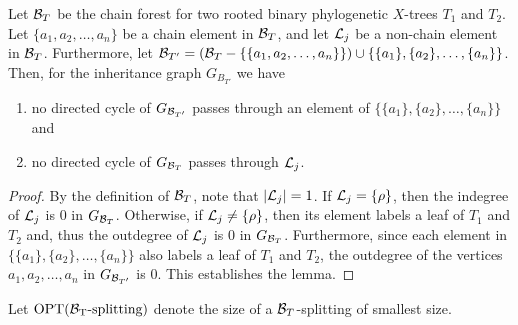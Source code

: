 \begin{lemma}\label{l:bTprops}
Let ${\mathcal B}_T$ be the chain forest for two rooted binary phylogenetic $X$-trees $T_1$ and $T_2$. Let $\{a_1,a_2,\ldots,a_n\}$ be a chain  element in ${\mathcal B}_T$, and let {${\mathcal L}_j$ be a non-chain element in ${\mathcal B}_T$}. Furthermore, let ${\mathcal B}_{T'}=({\mathcal B}_T-\{\{a_1,a_2,\ldots,a_n\}\})\cup\{\{a_1\},\{a_2\},\ldots,\{a_n\}\}$. Then, for the inheritance graph $G_{B_{T'}}$ we have
\begin{enumerate}
\item no directed cycle of $G_{{\mathcal B}_{T'}}$ passes through an element of $\{\{a_1\},\{a_2\},\ldots,\{a_n\}\}$ and
\item no directed cycle of $G_{{\mathcal B}_T}$ passes through {${\mathcal L}_j$}.
\end{enumerate}
\end{lemma}
\begin{proof}
{By the definition of ${\mathcal B}_T$, note that $|{\mathcal L}_j|=1$. If ${\mathcal L}_j=\{\rho\}$, then the indegree of ${\mathcal L}_j$ is 0 in $G_{{\mathcal B}_T}$. Otherwise, if ${\mathcal L}_j\ne\{\rho\}$, then its element labels a leaf of $T_1$ and $T_2$  and, thus the outdegree of ${\mathcal L}_j$ is 0 in $G_{{\mathcal B}_T}$.} Furthermore, since each element in $\{\{a_1\},\{a_2\},\ldots,\{a_n\}\}$ also labels a leaf of $T_1$ and $T_2$, the outdegree of the vertices $a_1,a_2,\ldots,a_n$ in $G_{{\mathcal B}_{T'}}$ is 0. This establishes the lemma.
\end{proof}

Let ${\rm OPT({\mathcal B}_T\mbox{-\rm splitting})}$ denote the size of a ${\mathcal B}_T$-splitting of smallest size.

